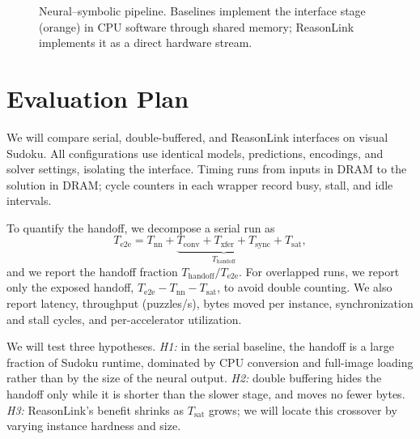 \documentclass[conference,10pt,letterpaper]{IEEEtran}
\begin{document}

\begin{figure}[t]
\centering

\caption{Neural--symbolic pipeline. Baselines implement the interface stage (orange) in CPU software through shared memory; ReasonLink implements it as a direct hardware stream.}
\label{fig:pipeline}
\end{figure}

\section{Evaluation Plan}
We will compare serial, double-buffered, and ReasonLink interfaces on visual Sudoku. All configurations use identical models, predictions, encodings, and solver settings, isolating the interface. Timing runs from inputs in DRAM to the solution in DRAM; cycle counters in each wrapper record busy, stall, and idle intervals.

To quantify the handoff, we decompose a serial run as
\begin{equation*}
T_{\text{e2e}} = T_{\text{nn}} + \underbrace{T_{\text{conv}} + T_{\text{xfer}} + T_{\text{sync}}}_{T_{\text{handoff}}} + T_{\text{sat}},
\end{equation*}
and we report the handoff fraction $T_{\text{handoff}}/T_{\text{e2e}}$. For overlapped runs, we report only the exposed handoff, $T_{\text{e2e}}-T_{\text{nn}}-T_{\text{sat}}$, to avoid double counting. We also report latency, throughput (puzzles/s), bytes moved per instance, synchronization and stall cycles, and per-accelerator utilization.

We will test three hypotheses. \emph{H1:} in the serial baseline, the handoff is a large fraction of Sudoku runtime, dominated by CPU conversion and full-image loading rather than by the size of the neural output. \emph{H2:} double buffering hides the handoff only while it is shorter than the slower stage, and moves no fewer bytes. \emph{H3:} ReasonLink's benefit shrinks as $T_{\text{sat}}$ grows; we will locate this crossover by varying instance hardness and size.
\end{document}
